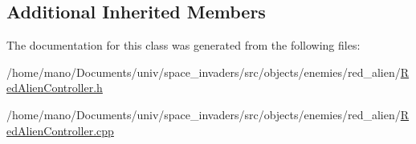 \subsection*{Additional Inherited Members}


The documentation for this class was generated from the following files\+:\begin{DoxyCompactItemize}
\item 
/home/mano/\+Documents/univ/space\+\_\+invaders/src/objects/enemies/red\+\_\+alien/\hyperlink{RedAlienController_8h}{Red\+Alien\+Controller.\+h}\item
/home/mano/\+Documents/univ/space\+\_\+invaders/src/objects/enemies/red\+\_\+alien/\hyperlink{RedAlienController_8cpp}{Red\+Alien\+Controller.\+cpp}\end{DoxyCompactItemize}
